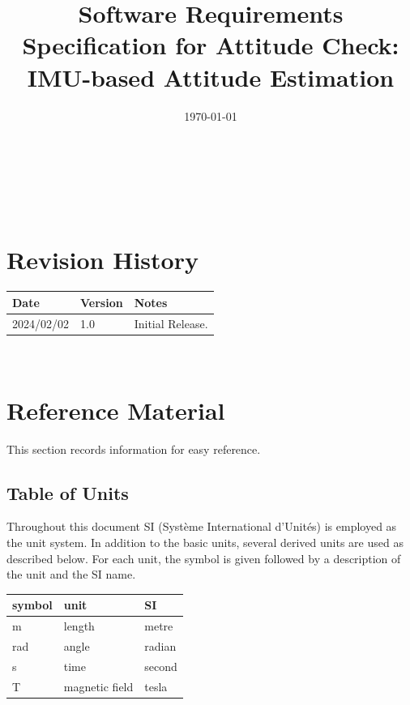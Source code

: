 \documentclass[12pt]{article}
\begin{document}
\title{Software Requirements Specification for Attitude Check: IMU-based Attitude Estimation} 
\author{\authname}
\date{\today}
	
\maketitle

~\newpage


\tableofcontents

~\newpage

\section*{Revision History}

\begin{tabularx}{\textwidth}{p{3cm}p{2cm}X} \toprule {\bf Date} & {\bf Version} & {\bf Notes}\\
\midrule
2024/02/02 & 1.0 & Initial Release.\\
\bottomrule
\end{tabularx}

~\newpage

\section{Reference Material}

This section records information for easy reference.

\subsection{Table of Units}

Throughout this document SI (Syst\`{e}me International d'Unit\'{e}s) is employed as the unit system.
In addition to the basic units, several derived units are used as described below.  For each unit,
the symbol is given followed by a description of the unit and the SI name. ~\newline

\renewcommand{\arraystretch}{1.2}
  \noindent \begin{tabular}{l l l} 
    \toprule		
    \textbf{symbol} & \textbf{unit} & \textbf{SI}\\
    \midrule 
    \si{\metre} & length & metre\\
    \si{\radian} & angle & radian\\
    \si{\second} & time & second\\
    \si{\tesla}      & magnetic field & tesla \\
    \bottomrule
  \end{tabular}
\end{document}
